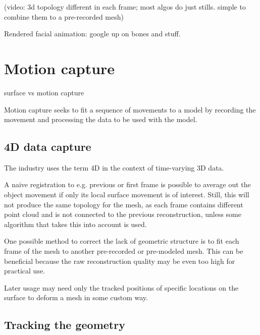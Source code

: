 (video: 3d topology different in each frame; most algos do just stills. simple to combine them to a pre-recorded mesh)

Rendered facial animation: google up on bones and stuff.

\section{Motion capture}

surface vs motion capture

Motion capture seeks to fit a sequence of movements to a model by recording the movement and processing the data to be used with the model. \cite{find-a-definition-somewhere}



\subsection{4D data capture} %

The industry uses the term 4D in the context of time-varying 3D data.

A naive registration to e.g. previous or first frame is possible to average out the object movement if only its local surface movement is of interest.
Still, this will not produce the same topology for the mesh, as each frame contains different point cloud and is not connected to the previous reconstruction, unless some algorithm that takes this into account is used.

One possible method to correct the lack of geometric structure is to fit each frame of the mesh to another pre-recorded or pre-modeled mesh. \cite{somewhere,remedysoftware?}
This can be beneficial because the raw reconstruction quality may be even too high for practical use.

Later usage may need only the tracked positions of specific locations on the surface to deform a mesh in some custom way.


\subsection{Tracking the geometry} %

